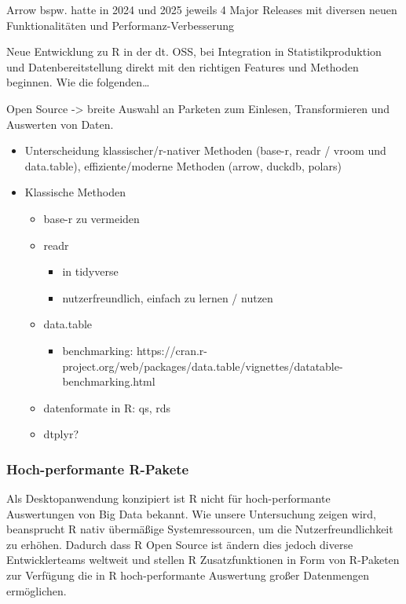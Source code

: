 \documentclass[
  german,
  10pt,
  twoside]{article}
\providecommand{\tightlist}{%
  \setlength{\itemsep}{0pt}\setlength{\parskip}{0pt}}
\begin{document}
Arrow bspw. hatte in 2024 und 2025 jeweils 4 Major Releases mit diversen
neuen Funktionalitäten und Performanz-Verbesserung

Neue Entwicklung zu R in der dt. OSS, bei Integration in
Statistikproduktion und Datenbereitstellung direkt mit den richtigen
Features und Methoden beginnen. Wie die folgenden\ldots{}

Open Source -\textgreater{} breite Auswahl an Parketen zum Einlesen,
Transformieren und Auswerten von Daten.

\begin{itemize}
\tightlist
\item
  Unterscheidung klassischer/r-nativer Methoden (base-r, readr / vroom
  und data.table), effiziente/moderne Methoden (arrow, duckdb, polars)
\item
  Klassische Methoden

  \begin{itemize}
  \tightlist
  \item
    base-r zu vermeiden
  \item
    readr

    \begin{itemize}
    \tightlist
    \item
      in tidyverse
    \item
      nutzerfreundlich, einfach zu lernen / nutzen
    \end{itemize}
  \item
    data.table

    \begin{itemize}
    \tightlist
    \item
      benchmarking:
      https://cran.r-project.org/web/packages/data.table/vignettes/datatable-benchmarking.html
    \end{itemize}
  \item
    datenformate in R: qs, rds
  \item
    dtplyr?
  \end{itemize}
\end{itemize}

\subsubsection{Hoch-performante
R-Pakete}\label{hoch-performante-r-pakete}

Als Desktopanwendung konzipiert ist R nicht für hoch-performante
Auswertungen von Big Data bekannt. Wie unsere Untersuchung zeigen wird,
beansprucht R nativ übermäßige Systemressourcen, um die
Nutzerfreundlichkeit zu erhöhen. Dadurch dass R Open Source ist ändern
dies jedoch diverse Entwicklerteams weltweit und stellen R
Zusatzfunktionen in Form von R-Paketen zur Verfügung die in R
hoch-performante Auswertung großer Datenmengen ermöglichen.
\end{document}
